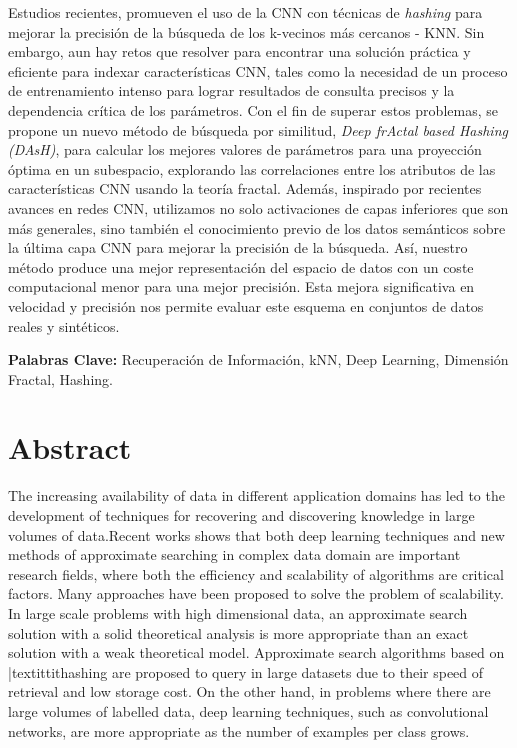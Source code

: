 Estudios recientes, promueven el uso de la \acf{CNN} con técnicas de  \textit{hashing} para mejorar la precisión de la búsqueda de los k-vecinos más cercanos - KNN.  Sin embargo, aun hay retos que resolver para encontrar una solución práctica y eficiente para indexar características  CNN, tales como la necesidad de un proceso de entrenamiento intenso para lograr resultados de consulta precisos y la dependencia crítica de los parámetros.   Con el fin de superar estos problemas, se propone un nuevo método de búsqueda por similitud, \textit{Deep frActal based  Hashing (DAsH)}, para calcular los mejores valores de parámetros  para una proyección óptima en un subespacio, explorando las correlaciones entre los atributos de las características  CNN usando la teoría fractal. Además, inspirado por recientes avances  en redes CNN, utilizamos no solo activaciones de capas inferiores que son más generales, sino también el conocimiento previo de los datos semánticos sobre la última capa CNN para mejorar la precisión de la búsqueda.  Así, nuestro método produce una mejor representación del espacio de datos con un coste computacional menor para una mejor precisión. Esta mejora  significativa en velocidad y precisión nos permite evaluar este esquema en conjuntos de datos reales y sintéticos.



\singlespacing
\vspace*{0.5cm} \noindent \textbf{Palabras Clave:}  Recuperación de Información, kNN, Deep Learning, Dimensión Fractal, Hashing.

 




\chapter*{Abstract}

 

The increasing availability of data in different application domains has led to the development of techniques for recovering and discovering knowledge in large volumes of data.Recent works shows that both deep learning techniques and new methods of approximate searching in complex data domain are important research fields, where both the efficiency and scalability of algorithms are critical factors. Many approaches have been proposed to solve the problem of scalability. In large scale problems with high dimensional data, an approximate search solution with a solid theoretical analysis is more appropriate than an exact solution with a weak theoretical model.    Approximate search algorithms based on |textittit{hashing} are proposed to query in large datasets due to their speed of retrieval and low storage cost.  On the other hand, in problems where there are large volumes of labelled data, deep learning techniques, such as convolutional networks, are more appropriate as the number of examples per class grows.

